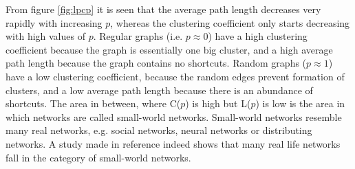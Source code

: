 \documentclass[10pt,a4paper]{article}
\begin{document}
\noindent From figure \ref{fig:lpcp} it is seen that the average path length decreases very rapidly with increasing $p$, whereas the clustering coefficient only starts decreasing with high values of $p$. Regular graphs (i.e. $p \approx 0$) have a high clustering coefficient because the graph is essentially one big cluster, and a high average path length because the graph contains no shortcuts. Random graphs ($p \approx 1$) have a low clustering coefficient, because the random edges prevent formation of clusters, and a low average path length because there is an abundance of shortcuts. The area in between, where C($p$) is high but L($p$) is low is the area in which networks are called small-world networks. Small-world networks resemble many real networks, e.g. social networks, neural networks or distributing networks. A study made in reference \cite{Watts Strogatz} indeed shows that many real life networks fall in the category of small-world networks.
\end{document}

